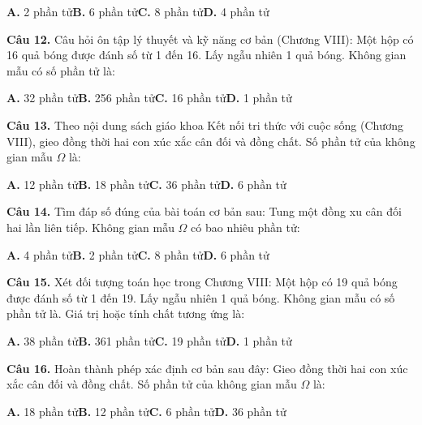 \documentclass[11pt,a4paper]{article}
\begin{document}
\hspace*{1.5em}\textbf{A.} 2 phần tử\quad\quad \textbf{B.} 6 phần tử\quad\quad \textbf{C.} 8 phần tử\quad\quad \textbf{D.} 4 phần tử\par\vspace{2pt}
\textbf{\color{primary} Câu 12.} Câu hỏi ôn tập lý thuyết và kỹ năng cơ bản (Chương VIII): Một hộp có 16 quả bóng được đánh số từ 1 đến 16. Lấy ngẫu nhiên 1 quả bóng. Không gian mẫu có số phần tử là:\par
\hspace*{1.5em}\textbf{A.} 32 phần tử\quad\quad \textbf{B.} 256 phần tử\quad\quad \textbf{C.} 16 phần tử\quad\quad \textbf{D.} 1 phần tử\par\vspace{2pt}
\textbf{\color{primary} Câu 13.} Theo nội dung sách giáo khoa Kết nối tri thức với cuộc sống (Chương VIII), gieo đồng thời hai con xúc xắc cân đối và đồng chất. Số phần tử của không gian mẫu $\Omega$ là:\par
\hspace*{1.5em}\textbf{A.} 12 phần tử\quad\quad \textbf{B.} 18 phần tử\quad\quad \textbf{C.} 36 phần tử\quad\quad \textbf{D.} 6 phần tử\par\vspace{2pt}
\textbf{\color{primary} Câu 14.} Tìm đáp số đúng của bài toán cơ bản sau: Tung một đồng xu cân đối hai lần liên tiếp. Không gian mẫu $\Omega$ có bao nhiêu phần tử:\par
\hspace*{1.5em}\textbf{A.} 4 phần tử\quad\quad \textbf{B.} 2 phần tử\quad\quad \textbf{C.} 8 phần tử\quad\quad \textbf{D.} 6 phần tử\par\vspace{2pt}
\textbf{\color{primary} Câu 15.} Xét đối tượng toán học trong Chương VIII: Một hộp có 19 quả bóng được đánh số từ 1 đến 19. Lấy ngẫu nhiên 1 quả bóng. Không gian mẫu có số phần tử là. Giá trị hoặc tính chất tương ứng là:\par
\hspace*{1.5em}\textbf{A.} 38 phần tử\quad\quad \textbf{B.} 361 phần tử\quad\quad \textbf{C.} 19 phần tử\quad\quad \textbf{D.} 1 phần tử\par\vspace{2pt}
\textbf{\color{primary} Câu 16.} Hoàn thành phép xác định cơ bản sau đây: Gieo đồng thời hai con xúc xắc cân đối và đồng chất. Số phần tử của không gian mẫu $\Omega$ là:\par
\hspace*{1.5em}\textbf{A.} 18 phần tử\quad\quad \textbf{B.} 12 phần tử\quad\quad \textbf{C.} 6 phần tử\quad\quad \textbf{D.} 36 phần tử\par\vspace{2pt}
\end{document}
